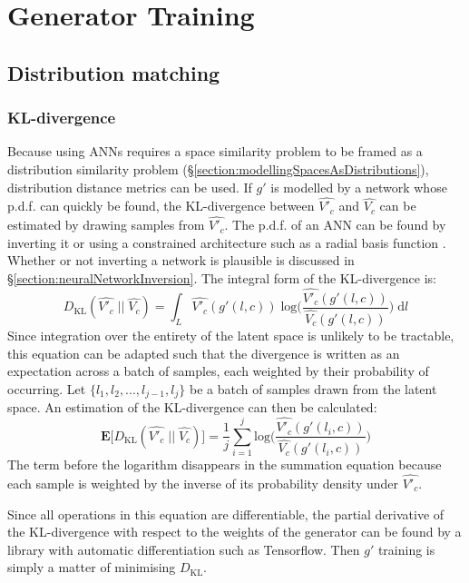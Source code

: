 \documentclass[../../main.tex]{subfiles}
\begin{document}
\chapter{Generator Training} \label{chapter:generatorTraining}

\section{Distribution matching} \label{section:distributionMatching}

\subsection{KL-divergence} \label{subsection:klDivergence}

Because using ANNs requires a space similarity problem to be framed as a distribution similarity problem (\S\ref{section:modellingSpacesAsDistributions}), distribution distance metrics can be used.
If $g'$ is modelled by a network whose p.d.f. can quickly be found, the KL-divergence between $\hat{V'_c}$ and $\hat{V_c}$ can be estimated by drawing samples from $\hat{V'_c}$.
The p.d.f. of an ANN can be found by inverting it or using a constrained architecture such as a radial basis function \cite{park91}.
Whether or not inverting a network is plausible is discussed in \S\ref{section:neuralNetworkInversion}.
The integral form of the KL-divergence is:
\begin{equation}
    D_{\text{KL}}(\hat{V'_c}\;||\;\hat{V_c})=\int_L\hat{V'_c}(g'(l,c))\;\text{log}\bigg(\frac{\hat{V'_c}(g'(l,c))}{\hat{V_c}(g'(l,c))}\bigg)\;\mathrm{d}l
\end{equation}
Since integration over the entirety of the latent space is unlikely to be tractable, this equation can be adapted such that the divergence is written as an expectation across a batch of samples, each weighted by their probability of occurring.
Let $\{l_1,l_2,...,l_{j-1},l_j\}$ be a batch of samples drawn from the latent space.
An estimation of the KL-divergence can then be calculated:
\begin{equation}
    \textbf{E}\big[D_{\text{KL}}(\hat{V'_c}\;||\;\hat{V_c})\big]=\frac{1}{j}\sum_{i=1}^{j}\text{log}\bigg(\frac{\hat{V'_c}(g'(l_i,c))}{\hat{V_c}(g'(l_i,c))}\bigg)
\end{equation}
The term before the logarithm disappears in the summation equation because each sample is weighted by the inverse of its probability density under $\hat{V'_c}$.

Since all operations in this equation are differentiable, the partial derivative of the KL-divergence with respect to the weights of the generator can be found by a library with automatic differentiation such as Tensorflow.
Then $g'$ training is simply a matter of minimising $D_\text{KL}$.
\end{document}
